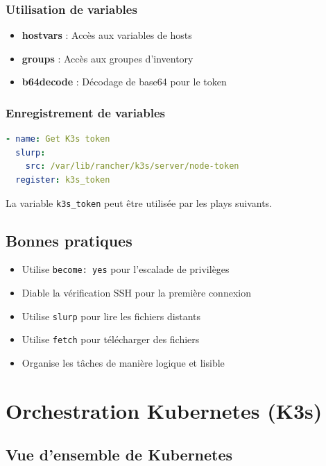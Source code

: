\documentclass[12pt,a4paper,twoside]{report}
\begin{document}
\subsection{Utilisation de variables}

\begin{itemize}
    \item \textbf{hostvars} : Accès aux variables de hosts
    \item \textbf{groups} : Accès aux groupes d'inventory
    \item \textbf{b64decode} : Décodage de base64 pour le token
\end{itemize}

\subsection{Enregistrement de variables}

\begin{lstlisting}[language=yaml]
- name: Get K3s token
  slurp:
    src: /var/lib/rancher/k3s/server/node-token
  register: k3s_token
\end{lstlisting}

La variable \texttt{k3s\_token} peut être utilisée par les plays suivants.

\section{Bonnes pratiques}

\begin{itemize}
    \item Utilise \texttt{become: yes} pour l'escalade de privilèges
    \item Diable la vérification SSH pour la première connexion
    \item Utilise \texttt{slurp} pour lire les fichiers distants
    \item Utilise \texttt{fetch} pour télécharger des fichiers
    \item Organise les tâches de manière logique et lisible
\end{itemize}

\newpage

\chapter{Orchestration Kubernetes (K3s)}

\section{Vue d'ensemble de Kubernetes}
\end{document}
